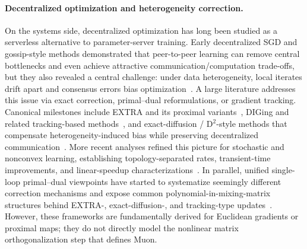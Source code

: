 \paragraph{Decentralized optimization and heterogeneity correction.}
On the systems side, decentralized optimization has long been studied as a serverless alternative to parameter-server training. Early decentralized SGD and gossip-style methods demonstrated that peer-to-peer learning can remove central bottlenecks and even achieve attractive communication/computation trade-offs, but they also revealed a central challenge: under data heterogeneity, local iterates drift apart and consensus errors bias optimization~\cite{lian2017dpsgd,lian2017async,tang2018d2}. A large literature addresses this issue via exact correction, primal--dual reformulations, or gradient tracking. Canonical milestones include EXTRA and its proximal variants~\cite{shi2015extra,shi2015pgextra}, DIGing and related tracking-based methods~\cite{nedic2017diging,pu2021dsgt,zhang2019dsgtnonconvex}, and exact-diffusion / D$^2$-style methods that compensate heterogeneity-induced bias while preserving decentralized communication~\cite{yuan2019exactdiffusion,tang2018d2}. More recent analyses refined this picture for stochastic and nonconvex learning, establishing topology-separated rates, transient-time improvements, and linear-speedup characterizations~\cite{alghunaim2022unified,xin2021topologyindependent,yuan2021removing,lu2020optimal,koloskova2020unified,hhuang2021transient,haomu2023speedup}. In parallel, unified single-loop primal--dual viewpoints have started to systematize seemingly different correction mechanisms and expose common polynomial-in-mixing-matrix structures behind EXTRA-, exact-diffusion-, and tracking-type updates~\cite{zhu2024sparkle}. However, these frameworks are fundamentally derived for Euclidean gradients or proximal maps; they do not directly model the nonlinear matrix orthogonalization step that defines Muon.

